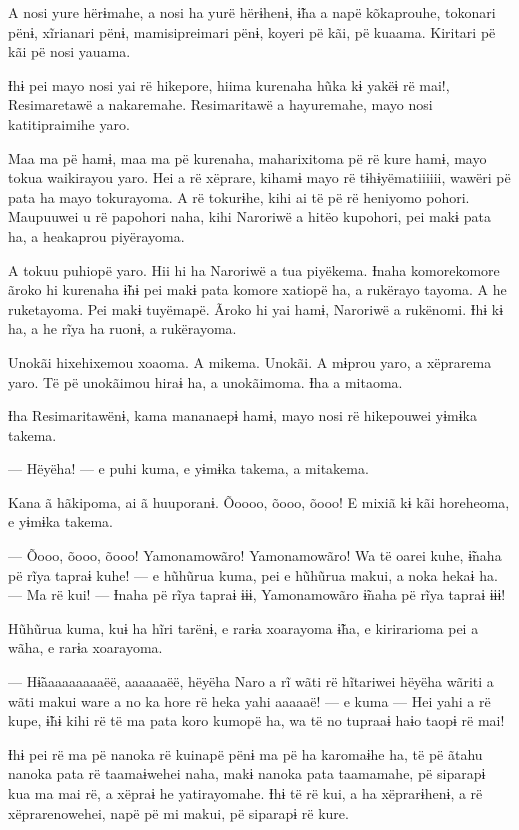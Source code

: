 A nosi yure hërɨmahe, a nosi ha yurë hërɨhenɨ, ɨ̃ha a napë kõkaprouhe,
tokonari pënɨ, xĩrianari pënɨ, mamisipreimari pënɨ, koyeri pë kãi, pë
kuaama. Kiritari pë kãi pë nosi yauama. 

Ɨhɨ pei mayo nosi yai rë hikepore, hiima kurenaha hũka kɨ yakëɨ rë mai!,
Resimaretawë a nakaremahe. Resimaritawë a hayuremahe, mayo nosi
katitipraimihe yaro. 

Maa ma pë hamɨ, maa ma pë kurenaha, maharixitoma pë rë kure hamɨ, mayo
tokua waikirayou yaro. Hei a rë xëprare, kihamɨ mayo rë tɨhɨyëmatiiiiii,
wawëri pë pata ha mayo tokurayoma. A rë tokurɨhe, kihi ai të pë rë
heniyomo pohori. Maupuuwei u rë papohori naha, kihi Naroriwë a hitëo
kupohori, pei makɨ pata ha, a heakaprou piyërayoma. 

A tokuu puhiopë yaro. Hii hi ha Naroriwë a tua piyëkema. Ɨnaha
komorekomore ãroko hi kurenaha ɨ̃hɨ pei makɨ pata komore xatiopë ha, a
rukërayo tayoma. A he ruketayoma. Pei makɨ tuyëmapë. Ãroko hi yai hamɨ,
Naroriwë a rukënomi. Ɨhɨ kɨ ha, a he rĩya ha ruonɨ, a rukërayoma. 

Unokãi hixehixemou xoaoma. A mikema. Unokãi. A mɨprou yaro, a xëprarema
yaro. Të pë unokãimou hiraɨ ha, a unokãimoma. Ɨha a mitaoma. 

Ɨha Resimaritawënɨ, kama mananaepɨ hamɨ, mayo nosi rë hikepouwei yɨmɨka
takema. 

 

--- Hëyëha! --- e puhi kuma, e yɨmɨka takema, a mitakema. 

Kana ã hãkipoma, ai ã huuporanɨ. Õoooo, õooo, õooo! E mixiã kɨ kãi
horeheoma, e yɨmɨka takema. 

--- Õooo, õooo, õooo! Yamonamowãro! Yamonamowãro! Wa të oarei kuhe,
ɨ̃naha pë rĩya tapraɨ kuhe! --- e hũhũrua kuma, pei e hũhũrua makui, a
noka hekaɨ ha. --- Ma rë kui! --- Ɨnaha pë rĩya tapraɨ ɨɨɨ, Yamonamowãro
ɨ̃naha pë rĩya tapraɨ ɨɨɨ! 

Hũhũrua kuma, kuɨ ha hĩri tarënɨ, e rarɨa xoarayoma ɨ̃ha, e kirirarioma
pei a wãha, e rarɨa xoarayoma. 

--- Hɨ̃aaaaaaaaaëë, aaaaaaëë, hëyëha Naro a rĩ wãti rë hĩtariwei hëyëha
wãriti a wãti makui ware a no ka hore rë heka yahi aaaaaë! --- e kuma
--- Hei yahi a rë kupe, ɨ̃hɨ kihi rë të ma pata koro kumopë ha, wa të no
tupraaɨ haɨo taopɨ rë mai! 

Ɨhɨ pei rë ma pë nanoka rë kuinapë pënɨ ma pë ha karomaɨhe ha, të pë
ãtahu nanoka pata rë taamaɨwehei naha, makɨ nanoka pata taamamahe, pë
siparapɨ kua ma mai rë, a xëpraɨ he yatirayomahe. Ɨhɨ të rë kui, a ha
xëprarɨhenɨ, a rë xëprarenowehei, napë pë mi makui, pë siparapɨ rë
kure. 

